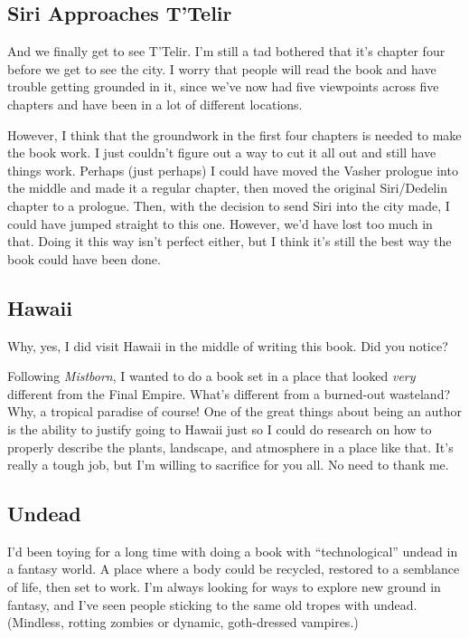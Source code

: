 \subsection*{Siri Approaches T’Telir}

And we finally get to see T’Telir. I’m still a tad bothered that it’s chapter four before we get to see the city. I worry that people will read the book and have trouble getting grounded in it, since we’ve now had five viewpoints across five chapters and have been in a lot of different locations.

However, I think that the groundwork in the first four chapters is needed to make the book work. I just couldn’t figure out a way to cut it all out and still have things work. Perhaps (just perhaps) I could have moved the Vasher prologue into the middle and made it a regular chapter, then moved the original Siri/Dedelin chapter to a prologue. Then, with the decision to send Siri into the city made, I could have jumped straight to this one. However, we’d have lost too much in that. Doing it this way isn’t perfect either, but I think it’s still the best way the book could have been done.

\subsection*{Hawaii}

Why, yes, I did visit Hawaii in the middle of writing this book. Did you notice?

Following \textit{Mistborn}, I wanted to do a book set in a place that looked \textit{very} different from the Final Empire. What’s different from a burned-out wasteland? Why, a tropical paradise of course! One of the great things about being an author is the ability to justify going to Hawaii just so I could do research on how to properly describe the plants, landscape, and atmosphere in a place like that. It’s really a tough job, but I’m willing to sacrifice for you all. No need to thank me.

\subsection*{Undead}

I’d been toying for a long time with doing a book with “technological” undead in a fantasy world. A place where a body could be recycled, restored to a semblance of life, then set to work. I’m always looking for ways to explore new ground in fantasy, and I’ve seen people sticking to the same old tropes with undead. (Mindless, rotting zombies or dynamic, goth-dressed vampires.)

